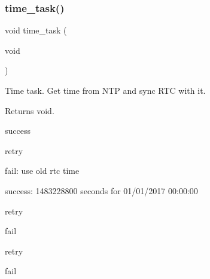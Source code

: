 \subsubsection{\texorpdfstring{time\+\_\+task()}{time\_task()}}
{\footnotesize\ttfamily void time\+\_\+task (\begin{DoxyParamCaption}\item[{void}]{ }\end{DoxyParamCaption})}



Time task. Get time from N\+TP and sync R\+TC with it. 

\begin{DoxyReturn}{Returns}
void. 
\end{DoxyReturn}
success

retry

fail\+: use old rtc time

success\+: 1483228800 seconds for 01/01/2017 00\+:00\+:00

retry

fail

retry

fail 